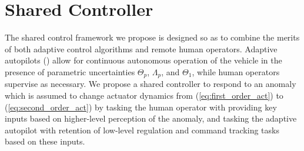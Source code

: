 \documentclass[english]{ifacconf}
\begin{document}


\section{Shared Controller}\label{sec:shared_ctrl}
The shared control framework we propose is designed so as to combine the merits of both adaptive control algorithms and remote human operators. Adaptive autopilots (\cite{lavretsky2013robust}) allow for continuous autonomous operation of the vehicle in the presence of parametric uncertainties $\Theta_p$, $\Lambda_p$, and $\Theta_1$, while human operators supervise as necessary. We propose a shared controller to respond to an anomaly which is assumed to change actuator dynamics from (\ref{eq:first_order_act}) to (\ref{eq:second_order_act}) by tasking the human operator with providing key inputs based on higher-level perception of the anomaly, and tasking the adaptive autopilot with retention of low-level regulation and command tracking tasks based on these inputs.
\end{document}
